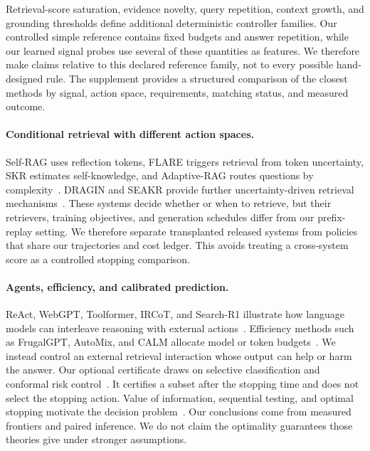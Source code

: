 Retrieval-score saturation, evidence novelty, query repetition, context
growth, and grounding thresholds define additional deterministic controller
families. Our controlled simple reference contains fixed budgets and answer
repetition, while our learned signal probes use several of these quantities as
features. We therefore make claims relative to this declared reference family,
not to every possible hand-designed rule. The supplement provides a structured
comparison of the closest methods by signal, action space, requirements,
matching status, and measured outcome.

\paragraph{Conditional retrieval with different action spaces.}
Self-RAG uses reflection tokens, FLARE triggers retrieval from token
uncertainty, SKR estimates self-knowledge, and Adaptive-RAG routes questions by
complexity~\cite{asai2024selfrag,jiang2023flare,wang2023skr,
jeong2024adaptiverag}. DRAGIN and SEAKR provide further uncertainty-driven
retrieval mechanisms~\cite{su2024dragin,yao2024seakr}. These systems decide
whether or when to retrieve, but their retrievers, training objectives, and
generation schedules differ from our prefix-replay setting. We therefore
separate transplanted released systems from policies that share our
trajectories and cost ledger. This avoids treating a cross-system score as a
controlled stopping comparison.

\paragraph{Agents, efficiency, and calibrated prediction.}
ReAct, WebGPT, Toolformer, IRCoT, and Search-R1 illustrate how language models
can interleave reasoning with external actions~\cite{yao2023react,
nakano2021webgpt,schick2023toolformer,trivedi2023ircot,jin2025searchr1}.
Efficiency methods such as FrugalGPT, AutoMix, and CALM allocate model or token
budgets~\cite{chen2023frugalgpt,aggarwal2024automix,schuster2022calm}. We instead
control an external retrieval interaction whose output can help or harm the
answer. Our optional certificate draws on selective classification and
conformal risk control~\cite{geifman2017selective,vovk2005algorithmic,
angelopoulos2024conformal,ren2023knowno}. It certifies a subset after the
stopping time and does not select the stopping action. Value of information,
sequential testing, and optimal stopping motivate the decision
problem~\cite{howard1966voi,wald1947sequential,chow1971great}. Our conclusions
come from measured frontiers and paired inference. We do not claim the
optimality guarantees those theories give under stronger assumptions.
